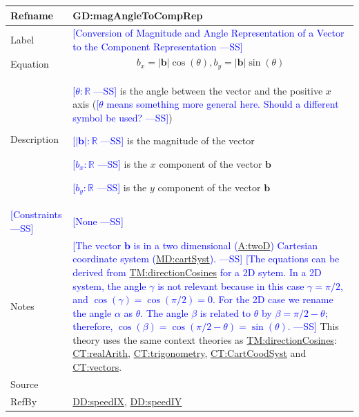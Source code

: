 \documentclass[12pt]{article}
\newcommand{\authornote}[3]{\textcolor{#1}{[#3 ---#2]}}
\newcommand{\authornote}[3]{}
\newcommand{\wss}[1]{\authornote{blue}{SS}{#1}}
\begin{document}
\medskip
\noindent
\begin{minipage}{\textwidth}
\begin{tabular}{>{\raggedright}p{}>{\raggedright\arraybackslash}p{}}
\toprule \textbf{Refname} & \textbf{GD:magAngleToCompRep}
\label{GD:magAngleToCompRep}
\\ \midrule
Label & \wss{Conversion of Magnitude and Angle Representation of a Vector to the
Component Representation}
        
\\ \midrule
Equation & \begin{displaymath}
           b_x = |\symbf{b}| \cos (\theta), b_y = |\symbf{b}| \sin (\theta)
           \end{displaymath}
\\ \midrule
Description & \begin{symbDescription}
              \item \wss{$\theta: \mathbb{R}$} is the angle between the vector and the positive $x$ axis (\wss{$\theta$ means something more general here.  Should a different symbol be used?})
              \item \wss{$|\symbf{b}|: \mathbb{R}$} is the magnitude of the vector
              \item \wss{$b_x: \mathbb{R}$} is the $x$ component of the vector $\symbf{b}$
              \item \wss{$b_y: \mathbb{R}$} is the $y$ component of the vector $\symbf{b}$
              \end{symbDescription}

\\ \midrule
\wss{Constraints} & \wss{None}

\\ \midrule
Notes & \wss{The vector $\symbf{b}$ is in a two dimensional
(\hyperref[twoD]{A:twoD}) Cartesian coordinate system
(\hyperref[MD:cartSyst]{MD:cartSyst}).} \wss{The equations can be derived from
\hyperref[TM:directionCosines]{TM:directionCosines} for a 2D sytem.  In a 2D system,
the angle $\gamma$ is not relevant because in this case $\gamma = \pi/2$, and 
$\cos(\gamma) = \cos(\pi/2) = 0$.  For the 2D case we rename the angle $\alpha$
as $\theta$.  The angle $\beta$ is related to $\theta$ by $\beta = \pi/2 -
\theta$; therefore, $\cos(\beta) = \cos(\pi/2 - \theta) = \sin(\theta)$.}  This theory uses the same context theories as \hyperref[TM:directionCosines]{TM:directionCosines}: \hyperref[CT:realArith]{CT:realArith}, \hyperref[CT:trigonometry]{CT:trigonometry}, \hyperref[CT:CartCoordSyst]{CT:CartCoodSyst} and \hyperref[CT:vectors]{CT:vectors}.

\\ \midrule
Source & \cite{}
         
\\ \midrule
RefBy & \hyperref[DD:speedIX]{DD:speedIX}, \hyperref[DD:speedIY]{DD:speedIY}
        
\\ \bottomrule
\end{tabular}
\end{minipage}
\end{document}
